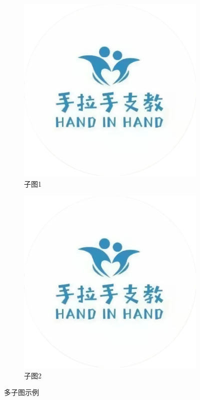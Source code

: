 \documentclass[12pt, a4paper, openany]{ctexbook} %
\begin{document}
\begin{figure}[htbp]
    \centering
    \begin{subfigure}[b]{0.4\textwidth}
        \includegraphics[width=\textwidth]{images/example-image-logo.png}
        \caption{子图1}
    \end{subfigure}
    \hfill
    \begin{subfigure}[b]{0.4\textwidth}
        \includegraphics[width=\textwidth]{images/example-image-logo.png}
        \caption{子图2}
    \end{subfigure}
    \caption{多子图示例}
    \label{fig:subfigs}
\end{figure}
\end{document}
